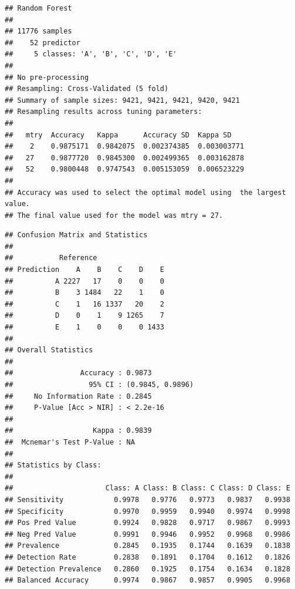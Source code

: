 \documentclass[]{article}
\newenvironment{Shaded}{\begin{snugshade}}{\end{snugshade}}
\newcommand{\KeywordTok}[1]{\textcolor[rgb]{0.13,0.29,0.53}{\textbf{{#1}}}}
\newcommand{\DataTypeTok}[1]{\textcolor[rgb]{0.13,0.29,0.53}{{#1}}}
\newcommand{\StringTok}[1]{\textcolor[rgb]{0.31,0.60,0.02}{{#1}}}
\newcommand{\NormalTok}[1]{{#1}}
\begin{document}
\begin{verbatim}
## Random Forest 
## 
## 11776 samples
##    52 predictor
##     5 classes: 'A', 'B', 'C', 'D', 'E' 
## 
## No pre-processing
## Resampling: Cross-Validated (5 fold) 
## Summary of sample sizes: 9421, 9421, 9421, 9420, 9421 
## Resampling results across tuning parameters:
## 
##   mtry  Accuracy   Kappa      Accuracy SD  Kappa SD   
##    2    0.9875171  0.9842075  0.002374385  0.003003771
##   27    0.9877720  0.9845300  0.002499365  0.003162878
##   52    0.9800448  0.9747543  0.005153059  0.006523229
## 
## Accuracy was used to select the optimal model using  the largest value.
## The final value used for the model was mtry = 27.
\end{verbatim}

\begin{Shaded}
\end{Shaded}

\begin{verbatim}
## Confusion Matrix and Statistics
## 
##           Reference
## Prediction    A    B    C    D    E
##          A 2227   17    0    0    0
##          B    3 1484   22    1    0
##          C    1   16 1337   20    2
##          D    0    1    9 1265    7
##          E    1    0    0    0 1433
## 
## Overall Statistics
##                                           
##                Accuracy : 0.9873          
##                  95% CI : (0.9845, 0.9896)
##     No Information Rate : 0.2845          
##     P-Value [Acc > NIR] : < 2.2e-16       
##                                           
##                   Kappa : 0.9839          
##  Mcnemar's Test P-Value : NA              
## 
## Statistics by Class:
## 
##                      Class: A Class: B Class: C Class: D Class: E
## Sensitivity            0.9978   0.9776   0.9773   0.9837   0.9938
## Specificity            0.9970   0.9959   0.9940   0.9974   0.9998
## Pos Pred Value         0.9924   0.9828   0.9717   0.9867   0.9993
## Neg Pred Value         0.9991   0.9946   0.9952   0.9968   0.9986
## Prevalence             0.2845   0.1935   0.1744   0.1639   0.1838
## Detection Rate         0.2838   0.1891   0.1704   0.1612   0.1826
## Detection Prevalence   0.2860   0.1925   0.1754   0.1634   0.1828
## Balanced Accuracy      0.9974   0.9867   0.9857   0.9905   0.9968
\end{verbatim}
\end{document}
